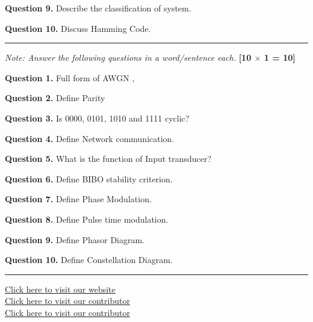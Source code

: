 \documentclass[11pt,a4paper]{article}
\begin{document}
\medskip\noindent\textbf{Question 9.} Describe the classification of system.

\medskip\noindent\textbf{Question 10.} Discuss Hamming Code.

\bigskip{}
\rule{\linewidth}{0.4pt}\smallskip

\noindent\textit{Note: Answer the following questions in a word/sentence each.} \hfill \textbf{[10 $\times$ 1 = 10]}

\medskip\noindent\textbf{Question 1.} Full form of AWGN ,

\medskip\noindent\textbf{Question 2.} Define Parity

\medskip\noindent\textbf{Question 3.} Is 0000, 0101, 1010 and 1111 cyclic?

\medskip\noindent\textbf{Question 4.} Define Network communication.

\medskip\noindent\textbf{Question 5.} What is the function of Input transducer?

\medskip\noindent\textbf{Question 6.} Define BIBO stability criterion.

\medskip\noindent\textbf{Question 7.} Define Phase Modulation.

\medskip\noindent\textbf{Question 8.} Define Pulse time modulation.

\medskip\noindent\textbf{Question 9.} Define Phasor Diagram.

\medskip\noindent\textbf{Question 10.} Define Constellation Diagram.

\vfill
\rule{\linewidth}{0.4pt}
\begin{center}\small
\href{https://bhu-exam.vercel.app/}{Click here to visit our website}\\[4pt]\href{https://me-aryan.vercel.app/}{Click here to visit our contributor}\\[4pt]\href{https://quashan-me.vercel.app/}{Click here to visit our contributor}
\end{center}
\end{document}
